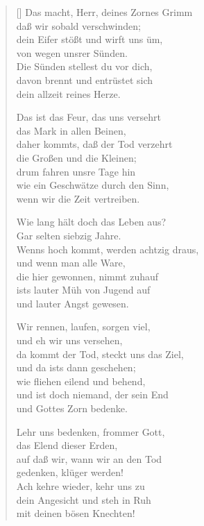 \begin{multicols}{2}
\begin{verse}[\versewidth]
 Das macht, Herr, deines Zornes Grimm\\
daß wir sobald verschwinden;\\
dein Eifer stößt und wirft uns üm,\\
von wegen unsrer Sünden.\\
Die Sünden stellest du vor dich,\\
davon brennt und entrüstet sich\\
dein allzeit reines Herze.

 Das ist das Feur, das uns versehrt\\
das Mark in allen Beinen,\\
daher kommts, daß der Tod verzehrt\\
die Großen und die Kleinen;\\
drum fahren unsre Tage hin\\
wie ein Geschwätze durch den Sinn,\\
wenn wir die Zeit vertreiben.

 Wie lang hält doch das Leben aus?\\
Gar selten siebzig Jahre.\\
Wenns hoch kommt, werden achtzig draus,\\
und wenn man alle Ware,\\
die hier gewonnen, nimmt zuhauf\\
ists lauter Müh von Jugend auf\\
und lauter Angst gewesen.

 Wir rennen, laufen, sorgen viel,\\
und eh wir uns versehen,\\
da kommt der Tod, steckt uns das Ziel,\\
und da ists dann geschehen;\\
wie fliehen eilend und behend,\\
und ist doch niemand, der sein End\\
und Gottes Zorn bedenke.

 Lehr uns bedenken, frommer Gott,\\
das Elend dieser Erden,\\
auf daß wir, wann wir an den Tod\\
gedenken, klüger werden!\\
Ach kehre wieder, kehr uns zu\\
dein Angesicht und steh in Ruh\\
mit deinen bösen Knechten!


\end{verse}
\end{multicols}
